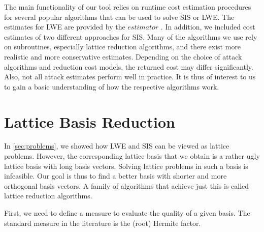 The main functionality of our tool relies on runtime cost estimation procedures for several popular algorithms that can be used to solve SIS or LWE. The estimates for LWE are provided by the $\textit{estimator}$ \cite{APS15}. In addition, we included cost estimates of two different approaches for SIS. Many of the algorithms we use rely on subroutines, especially lattice reduction algorithms, and there exist more realistic and more conservative estimates. Depending on the choice of attack algorithms and reduction cost models, the returned cost may differ significantly. Also, not all attack estimates perform well in practice. It is thus of interest to us to gain a basic understanding of how the respective algorithms work.


\section{Lattice Basis Reduction} %
In \cref{sec:problems}, we showed how LWE and SIS can be viewed as lattice problems. %
However, the corresponding lattice basis that we obtain is a rather ugly lattice basis with long basis vectors. Solving lattice problems in such a basis is infeasible. Our goal is thus to find a better basis with shorter and more orthogonal basis vectors. A family of algorithms that achieve just this is called lattice reduction algorithms.

First, we need to define a measure to evaluate the quality of a given basis. The standard measure in the literature is the (root) Hermite factor.




